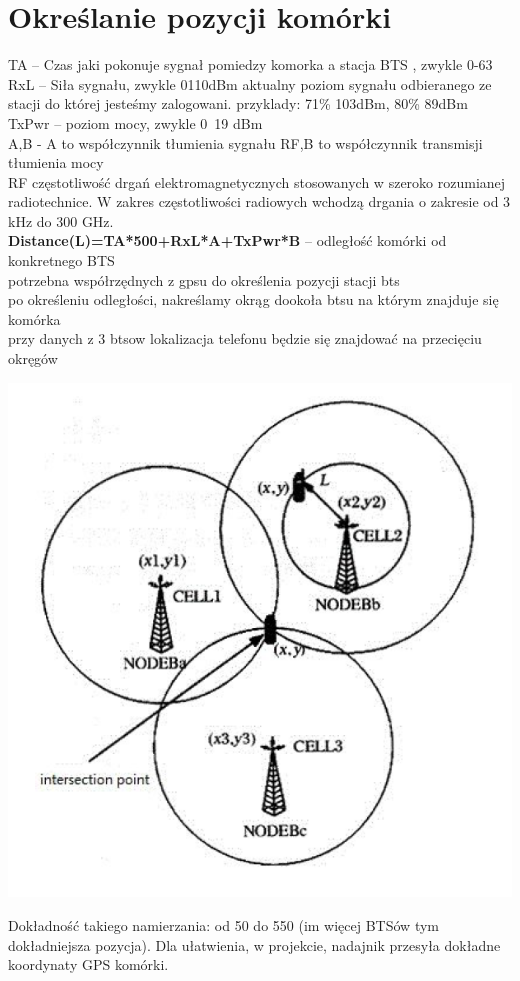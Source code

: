 \documentclass[a4paper,12pt]{article}
\begin{document}
\section{Określanie pozycji komórki}
TA – Czas jaki pokonuje sygnał pomiedzy komorka a stacja BTS , zwykle 0-63\\
RxL – Siła sygnału, zwykle 0110dBm
aktualny poziom sygnału odbieranego ze stacji do której jesteśmy zalogowani.
przyklady: 71\% 103dBm,
80\% 89dBm\\
TxPwr – poziom mocy, zwykle 0~19 dBm\\
A,B - A
to współczynnik tłumienia sygnału RF,B to współczynnik transmisji tłumienia mocy\\
RF częstotliwość
drgań elektromagnetycznych stosowanych w szeroko rozumianej
radiotechnice. W zakres częstotliwości radiowych wchodzą drgania o zakresie od 3 kHz do
300 GHz.\\
\textbf{Distance(L)=TA*500+RxL*A+TxPwr*B} -- odległość komórki od konkretnego
BTS\\
potrzebna współrzędnych z gpsu do określenia pozycji stacji bts\\
po określeniu odległości, nakreślamy okrąg dookoła btsu na którym znajduje się komórka\\
przy danych z 3 btsow lokalizacja telefonu będzie się znajdować na przecięciu okręgów\\
\begin{center}
\includegraphics[scale=0.75]{intersection.png}
\end{center}
Dokładność takiego namierzania: od 50 do 550 (im więcej BTSów tym dokładniejsza
pozycja). Dla ułatwienia, w projekcie, nadajnik przesyła dokładne koordynaty GPS komórki.
\newpage
\end{document}
